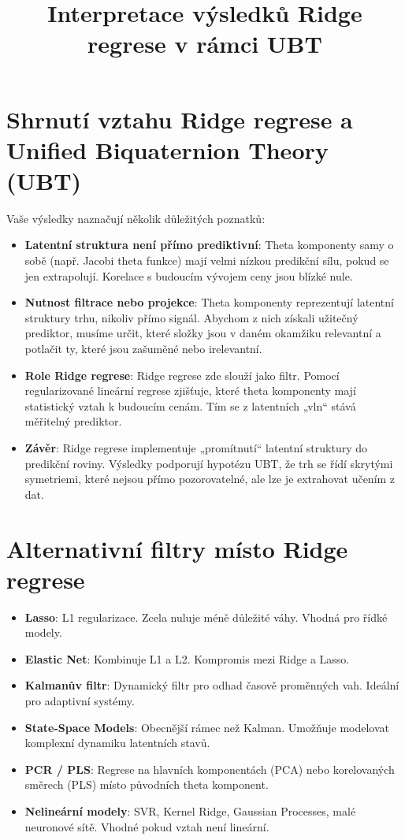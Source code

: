 \documentclass{article}
\title{Interpretace výsledků Ridge regrese v rámci UBT}
\author{}
\date{}
\begin{document}
\maketitle

\section*{Shrnutí vztahu Ridge regrese a Unified Biquaternion Theory (UBT)}

Vaše výsledky naznačují několik důležitých poznatků:

\begin{itemize}
    \item \textbf{Latentní struktura není přímo prediktivní}: Theta komponenty samy o sobě (např. Jacobi theta funkce) mají velmi nízkou predikční sílu, pokud se jen extrapolují. Korelace s budoucím vývojem ceny jsou blízké nule.

    \item \textbf{Nutnost filtrace nebo projekce}: Theta komponenty reprezentují latentní struktury trhu, nikoliv přímo signál. Abychom z nich získali užitečný prediktor, musíme určit, které složky jsou v daném okamžiku relevantní a potlačit ty, které jsou zašuměné nebo irelevantní.

    \item \textbf{Role Ridge regrese}: Ridge regrese zde slouží jako filtr. Pomocí regularizované lineární regrese zjišťuje, které theta komponenty mají statistický vztah k budoucím cenám. Tím se z latentních „vln“ stává měřitelný prediktor.

    \item \textbf{Závěr}: Ridge regrese implementuje „promítnutí“ latentní struktury do predikční roviny. Výsledky podporují hypotézu UBT, že trh se řídí skrytými symetriemi, které nejsou přímo pozorovatelné, ale lze je extrahovat učením z dat.
\end{itemize}

\section*{Alternativní filtry místo Ridge regrese}

\begin{itemize}
    \item \textbf{Lasso}: L1 regularizace. Zcela nuluje méně důležité váhy. Vhodná pro řídké modely.
    \item \textbf{Elastic Net}: Kombinuje L1 a L2. Kompromis mezi Ridge a Lasso.
    \item \textbf{Kalmanův filtr}: Dynamický filtr pro odhad časově proměnných vah. Ideální pro adaptivní systémy.
    \item \textbf{State-Space Models}: Obecnější rámec než Kalman. Umožňuje modelovat komplexní dynamiku latentních stavů.
    \item \textbf{PCR / PLS}: Regrese na hlavních komponentách (PCA) nebo korelovaných směrech (PLS) místo původních theta komponent.
    \item \textbf{Nelineární modely}: SVR, Kernel Ridge, Gaussian Processes, malé neuronové sítě. Vhodné pokud vztah není lineární.
\end{itemize}
\end{document}
